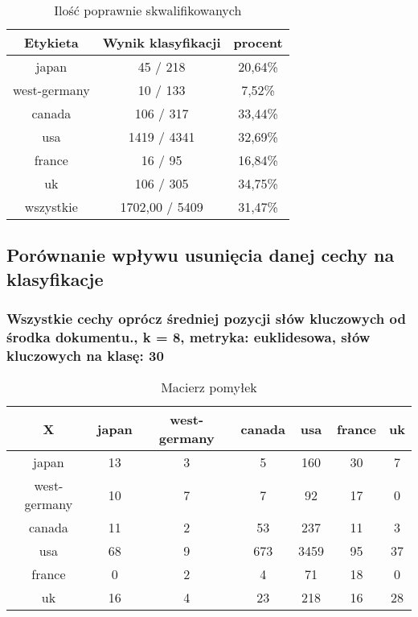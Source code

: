 \documentclass{classrep}
\begin{document}
\begin{table}[h]
\centering
\begin{tabular}{|c|c|c|}
\hline
Etykieta & Wynik klasyfikacji & procent\\
\hline
japan & 45 / 218 & 20,64\%\\
\hline
west-germany & 10 / 133 & 7,52\%\\
\hline
canada & 106 / 317 & 33,44\%\\
\hline
usa & 1419 / 4341 & 32,69\%\\
\hline
france & 16 / 95 & 16,84\%\\
\hline
uk & 106 / 305 & 34,75\%\\
\hline
wszystkie & 1702,00 / 5409 & 31,47\%\\
\hline
\end{tabular}
\caption{Ilość poprawnie skwalifikowanych}\end{table}




\newpage
\subsection{Porównanie wpływu usunięcia danej cechy na klasyfikacje}

\subsubsection{Wszystkie cechy oprócz średniej pozycji słów kluczowych od środka dokumentu., k = 8, metryka: euklidesowa, słów kluczowych na klasę: 30}
\begin{table}[h]
\centering
\begin{tabular}{|c|c|c|c|c|c|c|}
\hline
 X  & japan & west-germany & canada & usa & france & uk\\
\hline
japan & 13 & 3 & 5 & 160 & 30 & 7\\
\hline
west-germany & 10 & 7 & 7 & 92 & 17 & 0\\
\hline
canada & 11 & 2 & 53 & 237 & 11 & 3\\
\hline
usa & 68 & 9 & 673 & 3459 & 95 & 37\\
\hline
france & 0 & 2 & 4 & 71 & 18 & 0\\
\hline
uk & 16 & 4 & 23 & 218 & 16 & 28\\
\hline
\end{tabular}
\caption{Macierz pomyłek}\end{table}
\end{document}
